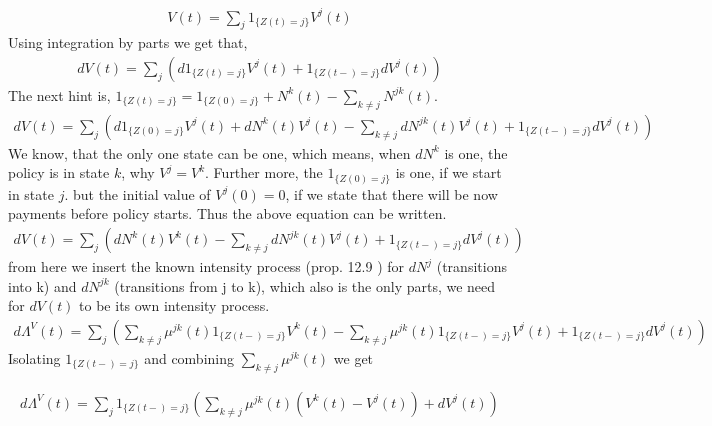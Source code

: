 \documentclass[12pt]{article}
\begin{document}
\begin{equation}
\begin{split}
V(t) = \sum_j 1_{\{Z(t)=j\}}V^j(t)
\end{split}
\end{equation}
Using integration by parts we get that,
\begin{equation}
\begin{split}
dV(t) =  \sum_j (d1_{\{Z(t)=j\}}V^j(t) + 1_{\{Z(t-)=j\}}dV^j(t))
\end{split}
\end{equation}
The next hint is, $1_{\{Z(t)=j\}}=1_{\{Z(0)=j\}} + N^k(t)-\sum_{k\neq j}N^{jk}(t)$.
\begin{equation}
\begin{split}
dV(t) =  \sum_j (d1_{\{Z(0)=j\}}V^j(t) + dN^k(t)V^j(t)-\sum_{k\neq j}dN^{jk}(t)V^j(t) + 1_{\{Z(t-)=j\}}dV^j(t))
\end{split}
\end{equation}
We know, that the only one state can be one, which means, when $dN^k$ is one, the policy is in state $k$, why $V^j=V^k$. Further more, the $1_{\{Z(0)=j\}}$ is one, if we start in state $j$. but the initial value of $V^j(0) = 0$, if we state that there will be now payments before policy starts. Thus the above equation can be written.
\begin{equation}
\begin{split}
dV(t) =  \sum_j (dN^k(t)V^k(t)-\sum_{k\neq j}dN^{jk}(t)V^j(t) + 1_{\{Z(t-)=j\}}dV^j(t))
\end{split}
\end{equation}
from here we insert the known intensity process (prop. 12.9 \cite{jl}) for $dN^j$ (transitions into k) and $dN^{jk}$ (transitions from j to k), which also is the only parts, we need for $dV(t)$ to be its own intensity process.
\begin{equation}
\begin{split}
d\Lambda^V(t) =  \sum_j (\sum_{k\neq j}\mu^{jk}(t)1_{\{Z(t-)=j\}}V^k(t)-\sum_{k\neq j}\mu^{jk}(t)1_{\{Z(t-)=j\}}V^j(t) + 1_{\{Z(t-)=j\}}dV^j(t))
\end{split}
\end{equation}
Isolating $1_{\{Z(t-)=j\}}$ and combining $\sum_{k\neq j}\mu^{jk}(t)$ we get

\begin{equation}
\begin{split}
d\Lambda^V(t) =  \sum_j 1_{\{Z(t-)=j\}}(\sum_{k\neq j}\mu^{jk}(t)(V^k(t) - V^j(t)) + dV^j(t))
\end{split}
\end{equation}
\end{document}
